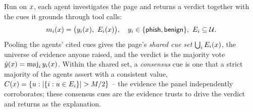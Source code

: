 Run on $x$, each agent investigates the page and returns a verdict together with
the cues it grounds through tool calls:
\begin{equation}
m_i(x) = \bigl(y_i(x),\ E_i(x)\bigr),\quad
y_i\in\{\textsf{phish},\textsf{benign}\},\ E_i\subseteq\mathcal{U} .
\label{eq:output}
\end{equation}
Pooling the agents' cited cues gives the page's \emph{shared cue set}
$\bigcup_iE_i(x)$, the universe of evidence anyone raised, and the verdict is
the majority vote $\hat y(x)=\mathrm{maj}_i\,y_i(x)$. Within the shared set, a
\emph{consensus} cue is one that a strict majority of the agents assert with a
consistent value, $C(x)=\{u: \lvert\{i: u\in E_i\}\rvert > M/2\}$ -- the
evidence the panel independently corroborates; these consensus cues are the evidence
\toolname{} trusts to drive the verdict and returns as the explanation.


